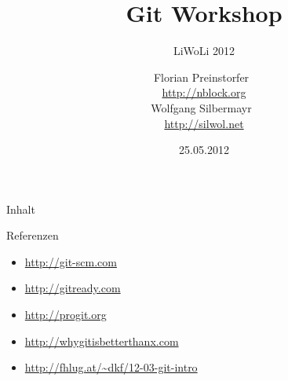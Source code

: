 \documentclass[%
]{beamer}
\title{Git Workshop}
\subtitle{LiWoLi 2012}
\author[Florian Preinstorfer, Wolfgang Silbermayr]{
  \parbox[t]{4cm}{\hfill Florian Preinstorfer\hfill\ \\\hbox{} \hfill{\footnotesize \url{http://nblock.org}}\hfill\hbox{}}
  \parbox[t]{4cm}{\hfill Wolfgang Silbermayr\hfill\ \\\hbox{} \hfill{\footnotesize \url{http://silwol.net}}\hfill\hbox{}}
}
\date[LiWoLi - 25.05.2012]{25.05.2012}
\begin{document}
\frame[plain]{\titlepage}

\begin{frame}{Inhalt}
  \tableofcontents
\end{frame}






\begin{frame}{Referenzen}
\begin{itemize}
  \item \url{http://git-scm.com}
  \item \url{http://gitready.com}
  \item \url{http://progit.org}
  \item \url{http://whygitisbetterthanx.com}
  \item \url{http://fhlug.at/~dkf/12-03-git-intro}
\end{itemize}
\end{frame}

\frame[plain]{\titlepage}
\end{document}
